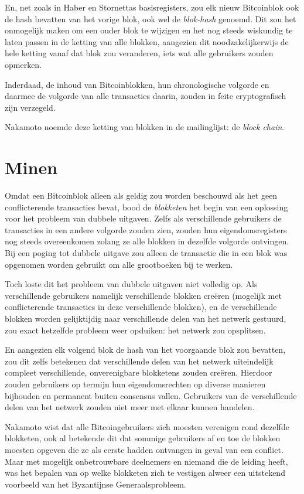 \documentclass[
  a5paper,
  smalldemyvopaper,11pt,twoside,onecolumn,openright,extrafontsizes,
hidelinks]{memoir}
\begin{document}
En, net zoals in Haber en Stornettas basisregisters, zou elk nieuw
Bitcoinblok ook de hash bevatten van het vorige blok, ook wel de
\emph{blok-hash} genoemd. Dit zou het onmogelijk maken om een ouder blok
te wijzigen en het nog steeds wiskundig te laten passen in de ketting
van alle blokken, aangezien dit noodzakelijkerwijs de hele ketting vanaf
dat blok zou veranderen, iets wat alle gebruikers zouden opmerken.

Inderdaad, de inhoud van Bitcoinblokken, hun chronologische volgorde en
daarmee de volgorde van alle transacties daarin, zouden in feite
cryptografisch zijn verzegeld.

Nakamoto noemde deze ketting van blokken in de mailinglijst: de
\emph{block chain}.

\section{Minen}\label{minen}

Omdat een Bitcoinblok alleen als geldig zou worden beschouwd als het
geen conflicterende transacties bevat, bood de \emph{blokketen} het
begin van een oplossing voor het probleem van dubbele uitgaven. Zelfs
als verschillende gebruikers de transacties in een andere volgorde
zouden zien, zouden hun eigendomsregisters nog steeds overeenkomen
zolang ze alle blokken in dezelfde volgorde ontvingen. Bij een poging
tot dubbele uitgave zou alleen de transactie die in een blok was
opgenomen worden gebruikt om alle grootboeken bij te werken.

Toch loste dit het probleem van dubbele uitgaven niet volledig op. Als
verschillende gebruikers namelijk verschillende blokken creëren
(mogelijk met conflicterende transacties in deze verschillende blokken),
en de verschillende blokken worden gelijktijdig naar verschillende delen
van het netwerk gestuurd, zou exact hetzelfde probleem weer opduiken:
het netwerk zou opsplitsen.

En aangezien elk volgend blok de hash van het voorgaande blok zou
bevatten, zou dit zelfs betekenen dat verschillende delen van het
netwerk uiteindelijk compleet verschillende, onverenigbare blokketens
zouden creëren. Hierdoor zouden gebruikers op termijn hun
eigendomsrechten op diverse manieren bijhouden en permanent buiten
consensus vallen. Gebruikers van de verschillende delen van het netwerk
zouden niet meer met elkaar kunnen handelen.

Nakamoto wist dat alle Bitcoingebruikers zich moesten verenigen rond
dezelfde blokketen, ook al betekende dit dat sommige gebruikers af en
toe de blokken moesten opgeven die ze als eerste hadden ontvangen in
geval van een conflict. Maar met mogelijk onbetrouwbare deelnemers en
niemand die de leiding heeft, was het bepalen van op welke blokketen
zich te vestigen alweer een uitstekend voorbeeld van het Byzantijnse
Generaalsprobleem.
\end{document}
